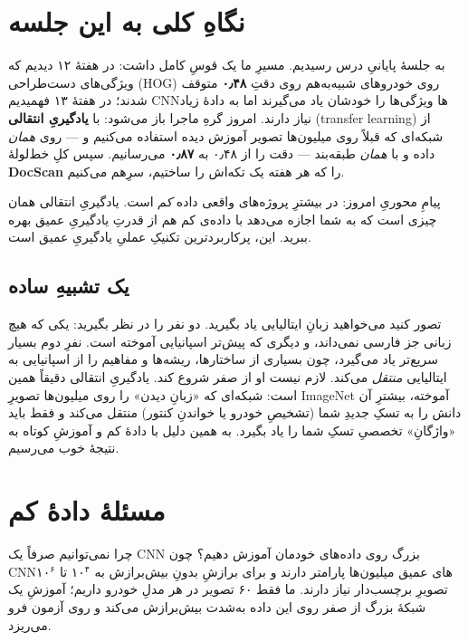 \documentclass[12pt,a4paper]{article}
\begin{document}

\section*{نگاهِ کلی به این جلسه}

به جلسهٔ پایانیِ درس رسیدیم. مسیرِ ما یک قوسِ کامل داشت: در هفتهٔ ۱۲ دیدیم که ویژگی‌های دست‌طراحی (HOG) روی خودروهای شبیه‌به‌هم روی دقتِ \textbf{۰٫۴۸} متوقف شدند؛ در هفتهٔ ۱۳ فهمیدیم CNNها ویژگی‌ها را خودشان یاد می‌گیرند اما به دادهٔ زیاد نیاز دارند. امروز گرهِ ماجرا باز می‌شود: با \textbf{یادگیریِ انتقالی} (transfer learning) از شبکه‌ای که قبلاً روی میلیون‌ها تصویر آموزش دیده استفاده می‌کنیم و — روی \emph{همان} داده و با \emph{همان} طبقه‌بند — دقت را از ۰٫۴۸ به \textbf{۰٫۸۷} می‌رسانیم. سپس کلِ خط‌لولهٔ \textbf{DocScan} را که هر هفته یک تکه‌اش را ساختیم، سرِ‌هم می‌کنیم.

\begin{yaddasht}
پیامِ محوریِ امروز: در بیشترِ پروژه‌های واقعی داده \emph{کم} است. یادگیریِ انتقالی همان چیزی است که به شما اجازه می‌دهد با داده‌ی کم هم از قدرتِ یادگیریِ عمیق بهره ببرید. این، پرکاربردترین تکنیکِ عملیِ یادگیریِ عمیق است.
\end{yaddasht}

\subsection*{یک تشبیهِ ساده}

تصور کنید می‌خواهید زبانِ ایتالیایی یاد بگیرید. دو نفر را در نظر بگیرید: یکی که هیچ زبانی جز فارسی نمی‌داند، و دیگری که پیش‌تر اسپانیایی آموخته است. نفرِ دوم بسیار سریع‌تر یاد می‌گیرد، چون بسیاری از ساختارها، ریشه‌ها و مفاهیم را از اسپانیایی به ایتالیایی \emph{منتقل} می‌کند. لازم نیست او از صفر شروع کند. یادگیریِ انتقالی دقیقاً همین است: شبکه‌ای که «زبانِ دیدن» را روی میلیون‌ها تصویرِ ImageNet آموخته، بیشترِ آن دانش را به تسکِ جدیدِ شما (تشخیصِ خودرو یا خواندنِ کنتور) منتقل می‌کند و فقط باید «واژگانِ» تخصصیِ تسکِ شما را یاد بگیرد. به همین دلیل با دادهٔ کم و آموزشِ کوتاه به نتیجهٔ خوب می‌رسیم.

\section{مسئلهٔ دادهٔ کم}

چرا نمی‌توانیم صرفاً یک CNNِ بزرگ روی داده‌های خودمان آموزش دهیم؟ چون CNNهای عمیق میلیون‌ها پارامتر دارند و برای برازشِ بدونِ بیش‌برازش به $۱۰^۴$ تا $۱۰^۶$ تصویرِ برچسب‌دار نیاز دارند. ما فقط ۶۰ تصویر در هر مدلِ خودرو داریم؛ آموزشِ یک شبکهٔ بزرگ از صفر روی این داده به‌شدت بیش‌برازش می‌کند و روی آزمون فرو می‌ریزد.
\end{document}
